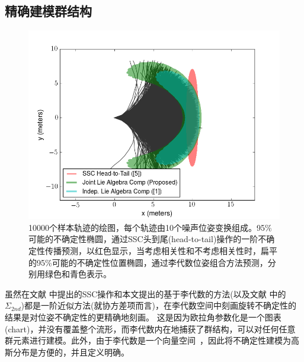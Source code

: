 \subsection{精确建模群结构}
\label{sec:pose_composition:comparison}

\begin{figure}[t]
    \centering
    \includegraphics[width=\columnwidth]{figures/10_nodes_sim_correlated.png}
    \caption{
    10000个样本轨迹的绘图，每个轨迹由10个噪声位姿变换组成。95\%可能的不确定性椭圆，通过SSC头到尾(head-to-tail)操作的一阶不确定性传播预测，以红色显示，当考虑相关性和不考虑相关性时，扁平的95\%可能的不确定性位置椭圆，通过李代数位姿组合方法预测，分别用绿色和青色表示。 }
    \label{fig:compose_example}
\end{figure}

虽然在文献 \cite{smith1990a} 中提出的SSC操作和本文提出的基于李代数的方法(以及文献 \cite[(55)]{barfoot2014associating} 中的 $\Sigma_{2nd}$)都是一阶近似方法(就协方差项而言)，在李代数空间中刻画旋转不确定性的结果是对位姿不确定性的更精确地刻画。 
这是因为欧拉角参数化是一个图表(chart)，并没有覆盖整个流形，而李代数内在地捕获了群结构，可以对任何任意群元素进行建模。此外，由于李代数是一个向量空间~\cite{tapp2016matrix}，因此将不确定性建模为高斯分布是方便的，并且定义明确。 

